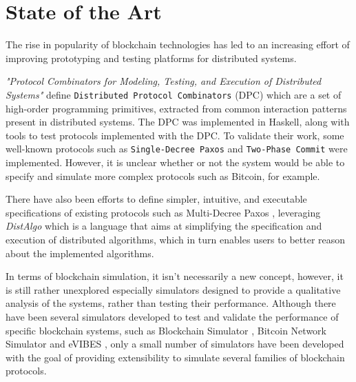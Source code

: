 

\chapter{State of the Art}
\label{cha:state-of-the-art}

The rise in popularity of blockchain technologies has led to an increasing effort of improving prototyping and testing platforms for distributed systems.

\textit{"Protocol Combinators for Modeling, Testing, and Execution of Distributed Systems"} \cite{combinators_dist_systems} define \texttt{Distributed Protocol Combinators} (DPC) which are a set of high-order programming primitives, extracted from common interaction patterns present in distributed systems. The DPC was implemented in Haskell, along with tools to test protocols implemented with the DPC. To validate their work, some well-known protocols such as \texttt{Single-Decree Paxos} and \texttt{Two-Phase Commit} were implemented. However, it is unclear whether or not the system would be able to specify and simulate more complex protocols such as Bitcoin, for example.

There have also been efforts to define simpler, intuitive, and executable specifications of existing protocols such as Multi-Decree Paxos \cite{paxos_highlevel_spec}, leveraging \textit{DistAlgo} \cite{distalgo} which is a language that aims at simplifying the specification and execution of distributed algorithms, which in turn enables users to better reason about the implemented algorithms.

In terms of blockchain simulation, it isn’t necessarily a new concept, however, it is still rather unexplored especially simulators designed to provide a qualitative analysis of the systems, rather than testing their performance. Although there have been several simulators developed to test and validate the performance of specific blockchain systems, such as Blockchain Simulator \cite{sec_pow_blockchains}, Bitcoin Network Simulator \cite{local_bitcoin_netsim} and eVIBES \cite{evibes}, only a small number of simulators have been developed with the goal of providing extensibility to simulate several families of blockchain protocols.

